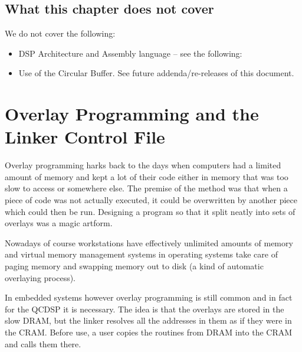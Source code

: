 \subsection{What this chapter does not cover}
We do not cover the following:
\begin{itemize}
\item
DSP Architecture and Assembly language -- see the following:
\item
Use of the Circular Buffer. See future addenda/re-releases of this 
document.
\end{itemize}

\section{Overlay Programming and the Linker Control File}
Overlay programming harks back to the days when computers had a limited
amount of memory and kept a lot of their code either in memory
that was too slow to access or somewhere else. The premise of the method
was that when a piece of code was not actually executed, it could be 
overwritten by another piece which could then be run. Designing a program so
that it split neatly into sets of overlays was a magic artform.

Nowadays of course workstations have effectively unlimited amounts of memory
and virtual memory management systems in operating systems take care
of paging memory and swapping memory out to disk (a kind of automatic
overlaying process). 

In embedded systems however overlay programming is still common and in
fact for the QCDSP it is necessary. The idea is that the overlays are
stored in the slow DRAM, but the linker resolves all the addresses in them
as if they were in the CRAM. Before use, a user copies the routines from 
DRAM into the CRAM and calls them there. 

